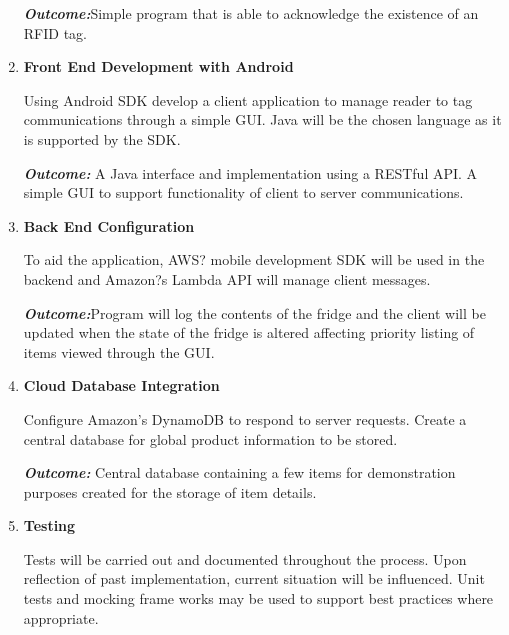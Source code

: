 \documentclass[a4paper, 11pt]{article}
\begin{document}
\begin{enumerate}
\begin{flushleft}
	\emph{\textbf{Outcome:}}Simple program that is able to acknowledge the existence of an RFID tag. 
		  \vspace{\baselineskip}

  	\end{flushleft}
	   \item \textbf{Front End Development with Android}
   	\begin{flushleft}Using Android SDK develop a client application to manage reader to tag communications through a simple GUI. Java will be the chosen language as it is supported by the SDK.
	
	\emph{\textbf{Outcome:}} A Java interface and implementation using a RESTful API. A simple GUI to support functionality of client to server communications. 
	\end{flushleft}
	\vspace{\baselineskip}
 
   \item \textbf{Back End Configuration }
   	\begin{flushleft}To aid the application, AWS? mobile development SDK will be used in the backend and Amazon?s Lambda API will manage client messages. 
	
	\emph{\textbf{Outcome:}}Program will log the contents of the fridge and the client will be updated when the state of the fridge is altered affecting priority listing of items viewed through the GUI.	\vspace{\baselineskip}
  	\end{flushleft}
	   \item \textbf{Cloud Database Integration}
   	\begin{flushleft} Configure Amazon's DynamoDB to respond to server requests. Create a central database for global product information to be stored.
	
	\emph{\textbf{Outcome:}} Central database containing a few items for demonstration purposes created for the storage of item details. 
	\vspace{\baselineskip}
  	\end{flushleft}
	 
   \item \textbf{Testing}
   	\begin{flushleft}Tests will be carried out and documented throughout the process. Upon reflection of past implementation, current situation will be influenced. Unit tests and mocking frame works may be used to support best practices where appropriate.
	  	

\end{flushleft}
\end{enumerate}
\end{document}
